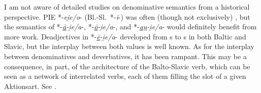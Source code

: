 \documentclass[output=paper,colorlinks,citecolor=brown]{langscibook}
\begin{document}
I am not aware of detailed studies on denominative semantics from a historical perspective. PIE *-\textit{ei̯e/o}- (Bl.-Sl.\ *-\textit{ī}-) was often (though not exclusively) , but the semantics of *-\textit{\underline{ā}-i̯e/a}-, *-\textit{\underline{ō}-i̯e/a}-, and *-\textit{\underline{au̯}-i̯e/a}- would definitely benefit from more work. Deadjectives  in *-\textit{\underline{ē}-i̯e/a}- developed from s to s in both Baltic and Slavic, but the interplay between both values is well known. As for the interplay between denominatives and deverbatives, it has been rampant. This may be a consequence, in part, of the architecture of the Balto-Slavic verb, which can be seen as a network of interrelated verbs, each of them filling the slot of a given Aktionsart. See .
\end{document}
